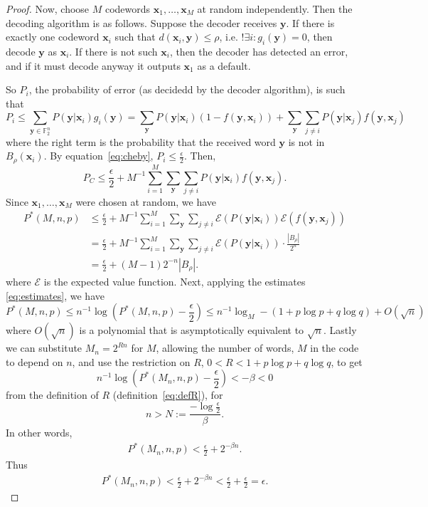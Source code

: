 \documentclass{article}
\newcommand{\F}{\mathbb{F}}
\newcommand{\E}{\mathcal{E}}
\renewcommand{\=}{\equiv}
\renewcommand{\i}{^{-1}}
\renewcommand{\v}{\mathbf}
\newcommand{\x}{{\v x}}
\newcommand{\y}{{\v y}}
\theoremstyle{plain}
\theoremstyle{definition}
\begin{document}
\begin{proof}
Now, choose $M$ codewords $\x_1, \dots, \x_M$ at random independently.
Then the decoding algorithm is as follows.
Suppose the decoder receives $\y$.
If there is exactly one codeword $\x_i$ such that $d(\x_i, \y) \leq \rho$, i.e. $!\exists i : g_i(\y) = 0$, then decode $\y$ as $\x_i$.
If there is not such $\x_i$, then the decoder has detected an error, and if it must decode anyway it outputs $\x_1$ as a default.

So $P_i$, the probability of error (as decidedd by the decoder algorithm), is such that
$$
  P_i
  \leq \sum_{\y \in \F_2^n} P(\y|\x_i) g_i(\y)
  = \sum_{\y} P(\y|\x_i)(1 - f(\y, \x_i)) + \sum_{\y} \sum_{j \neq i} P(\y|\x_j) f(\y, \x_j)
$$
where the right term is the probability that the received word $\y$ is not in $B_\rho(\x_i)$.
By equation~\ref{eq:cheby}, $P_i \leq \frac{\epsilon}{2}$.
Then,
$$ P_C \leq \frac{\epsilon}{2} + M\i \sum_{i = 1}^M \sum_{\y} \sum_{j \neq i} P(\y|\x_i) f(\y, \x_j). $$
Since $\x_1, \dots, \x_M$ were chosen at random, we have
\begin{align*}
  P^*(M, n, p)
  &\leq \frac{\epsilon}{2} + M\i \sum_{i = 1}^M \sum_{\y} \sum_{j \neq i} \E(P(\y|\x_i)) \E(f(\y, \x_j)) \\
  &= \frac{\epsilon}{2} + M\i \sum_{i = 1}^M \sum_{\y} \sum_{j \neq i} \E(P(\y|\x_i)) \cdot \frac{|B_\rho|}{2^n} \\
  &= \frac{\epsilon}{2} + (M - 1)2^{-n} |B_\rho|.
\end{align*}
where $\E$ is the expected value function.
Next, applying the estimates \ref{eq:estimates}, we have
$$ P^*(M, n, p) \leq n\i \log(P^*(M,n,p) - \frac{\epsilon}{2}) \leq n\i \log_M - (1 + p \log p + q \log q) + O(\sqrt{n}) $$
where $O(\sqrt{n})$ is a polynomial that is asymptotically equivalent to $\sqrt{n}$.
Lastly we can substitute $M_n = 2^{Rn}$ for $M$, allowing the number of words, $M$ in the code to depend on $n$, and use the restriction on $R$, $0 < R < 1 + p \log p + q \log q$, to get
$$ n\i \log(P^*(M_n, n, p) - \frac{\epsilon}{2}) < - \beta < 0 $$
from the definition of $R$ (definition~\ref{eq:defR}), for $$n > N := \frac{-\log\frac{\epsilon}{2}}{\beta}.$$
In other words,
\begin{align*}
  P^*(M_n, n, p) < \frac{\epsilon}{2} + 2^{-\beta n}.
\end{align*}
Thus
\begin{align*}
  P^*(M_n, n, p)
  < \frac{\epsilon}{2} + 2^{-\beta n}
  < \frac{\epsilon}{2} + \frac{\epsilon}{2}
  = \epsilon.
\end{align*}
\end{proof}
\end{document}
